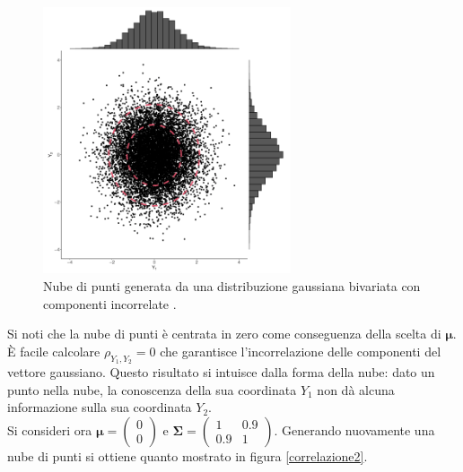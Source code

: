 \begin{figure}[h]
    \centering
    \includegraphics[width=0.65\textwidth]{images/Gaussiane/VettoreBivariatoIndipendenza.png}
    \caption{Nube di punti generata da una distribuzione gaussiana bivariata con componenti incorrelate \cite{wilkinson_introduction_2020}.}
    \label{correlazione1}
\end{figure}


\newpage
Si noti che la nube di punti è centrata in zero come conseguenza della scelta di $\bm{\mu}$. È facile calcolare $\rho_{Y_1,Y_2}=0$ che garantisce l'incorrelazione delle componenti del vettore gaussiano. Questo risultato si intuisce dalla forma della nube: dato un punto nella nube, la conoscenza della sua coordinata $Y_1$ non dà alcuna informazione sulla sua coordinata $Y_2$.\\
Si consideri ora $\bm{\mu} = \begin{pmatrix}0\\0\end{pmatrix}$ e $\mathbf{\Sigma}=\begin{pmatrix}1&0.9\\0.9&1\end{pmatrix}$. Generando nuovamente una nube di punti si ottiene quanto mostrato in figura \ref{correlazione2}.\\

